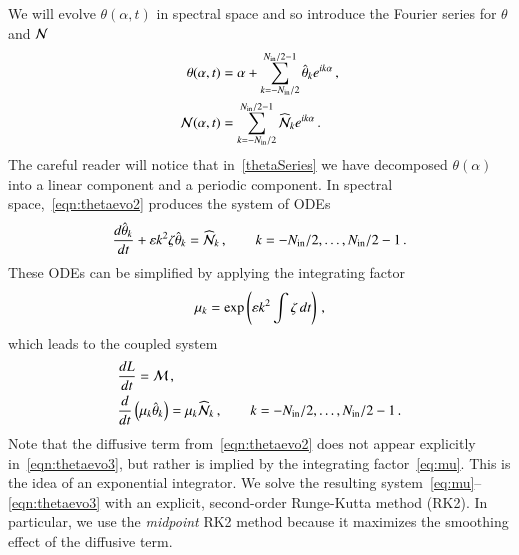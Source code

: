 \documentclass[preprint, 10pt]{elsarticle}
\begin{document}
We will evolve $\theta(\alpha,t)$ in spectral space and so introduce the Fourier series for $\theta$ and $\mathcal{N}$
\begin{align}
\label{thetaSeries}
 \theta(\alpha,t) &= \alpha + \FourierSum \thhat_k e^{ i k \alpha} \, , \\
 \NLterm(\alpha,t)  &= \FourierSum \widehat{\NLterm}_k e^{ i k \alpha} \, .
\end{align}
The careful reader will notice that in~\eqref{thetaSeries} we have decomposed $\theta(\alpha)$ into a linear component and a periodic component. In spectral space,~\eqref{eqn:thetaevo2} produces the system of ODEs
\begin{align}
\tderiv{\thhat_k}{t} +  \eps k^2  \elfun \thhat_k =
\widehat{\NLterm}_k\, ,
\qquad k=-N_\iin/2,\ldots,N_\iin/2-1\, .
\end{align}
These ODEs can be simplified by applying the integrating factor
\begin{align}
\label{eq:mu}
\mu_k = \exp \left( \varepsilon k^2 \int \zeta \, dt \right) \, ,
\end{align}
which leads to the coupled system
\begin{align}
\label{eqn:Levo3}
& \tderiv{L}{t} = \Mterm \, , \\
\label{eqn:thetaevo3}
& \tderiv{}{t}\left( \mu_k \thhat_k \right) = \mu_k \widehat{\NLterm}_k \, ,
\qquad k = -N_\iin/2, \ldots, N_\iin/2 -1 \, .
\end{align}
Note that the diffusive term from~\eqref{eqn:thetaevo2} does not appear explicitly in~\eqref{eqn:thetaevo3}, but rather is implied by the integrating factor~\eqref{eq:mu}. This is the idea of an exponential integrator. We solve the resulting system~\eqref{eq:mu}--\eqref{eqn:thetaevo3} with an explicit, second-order Runge-Kutta method (RK2). In particular, we use the {\em midpoint} RK2 method because it maximizes the smoothing effect of the diffusive term.
\end{document}
